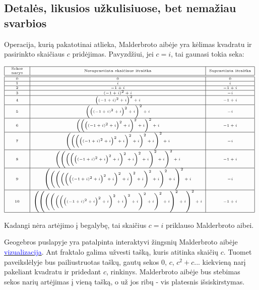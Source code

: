 \documentclass[a4paper]{article}
\newcommand{\goto}[2]{\href{\detokenize{#1}}{\textcolor{blue}{#2}}}
\begin{document}
\subsection*{Detalės, likusios užkulisiuose, bet nemažiau svarbios}

Operacija, kurią pakatotinai atlieka, Malderbroto aibėje yra kėlimas kvadratu ir pasirinkto skaičiaus $c$ pridėjimas. Pavyzdžiui, jei $c=i$, tai gaunasi tokia seka:
 
$\tiny\begin{array}{|c|c|c|}\hline \begin{array}{c}\text{Sekos}\\ \text{narys}\end{array} & \text{Nesuprastinta skaičiaus išraiška} & \text{Suprastinta išraiška} \\ \hline \hline
0&0&0\\ \hline
1&i&i\\ \hline
2&-1 + i&-1 + i\\ \hline
3&\left(-1 + i\right)^{2} + i&- i\\ \hline
4&\left(\left(-1 + i\right)^{2} + i\right)^{2} + i&-1 + i\\ \hline
5&\left(\left(\left(-1 + i\right)^{2} + i\right)^{2} + i\right)^{2} + i&- i\\ \hline
6&\left(\left(\left(\left(-1 + i\right)^{2} + i\right)^{2} + i\right)^{2} + i\right)^{2} + i&-1 + i\\ \hline
7&\left(\left(\left(\left(\left(-1 + i\right)^{2} + i\right)^{2} + i\right)^{2} + i\right)^{2} + i\right)^{2} + i&- i\\ \hline
8&\left(\left(\left(\left(\left(\left(-1 + i\right)^{2} + i\right)^{2} + i\right)^{2} + i\right)^{2} + i\right)^{2} + i\right)^{2} + i&-1 + i\\ \hline
9&\left(\left(\left(\left(\left(\left(\left(-1 + i\right)^{2} + i\right)^{2} + i\right)^{2} + i\right)^{2} + i\right)^{2} + i\right)^{2} + i\right)^{2} + i&- i\\ \hline
10&\left(\left(\left(\left(\left(\left(\left(\left(-1 + i\right)^{2} + i\right)^{2} + i\right)^{2} + i\right)^{2} + i\right)^{2} + i\right)^{2} + i\right)^{2} + i\right)^{2} + i&-1 + i\\ \hline
\end{array}$

Kadangi nėra artėjimo į begalybę, tai skaičius $c = i$ priklauso Malderbroto aibei.

Geogebros puslapyje yra patalpinta interaktyvi žingsnių Malderbroto aibėje \goto{https://www.geogebra.org/m/Npd3kBKn}{vizualizacija}. Ant fraktalo galima užvesti tašką, kuris atitinka skaičių $c$. Tuomet paveikslėlyje bus pailiustruotas taškų, gautų sekos $0$, $c$, $c^2+c...$ kiekvieną narį pakeliant kvadratu ir pridedant $c$, rinkinys. Malderbroto aibėje bus stebimas sekos narių artėjimas į vieną tašką, o už jos ribų - vis platesnis išsiskirstymas.
\end{document}
